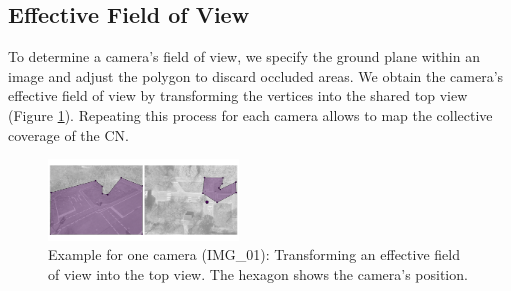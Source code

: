 \subsection{Effective Field of View}

To determine a camera’s field of view, we specify the ground plane within 
an image and adjust the polygon to discard occluded areas. 
We obtain the camera's effective field of view by transforming the vertices
into the shared top view (Figure \ref{fig:fov}). Repeating this process 
for each camera allows to map the collective coverage of the CN.

\begin{figure}[t]
	\centering
	\includegraphics[width=0.45\textwidth]{figures/predicted_fov.png}
	\caption{Example for one camera (IMG\_01): Transforming an effective field 
	of view into the top view. The hexagon shows the camera's position.}
	\label{fig:fov}
\end{figure}


